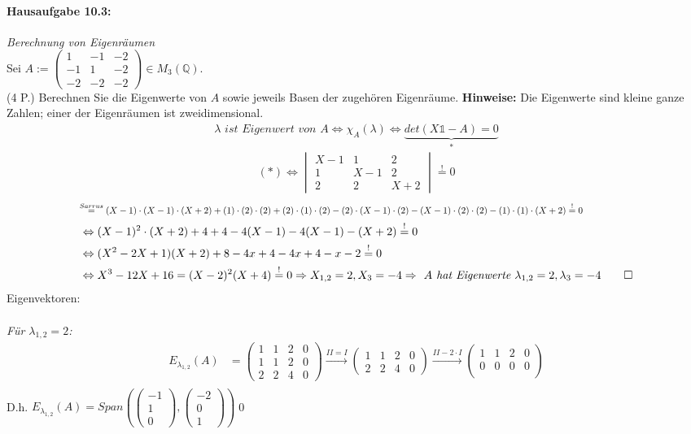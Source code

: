 \documentclass[titlepage]{article}
\newcommand{\Q}{\mathbb{Q}}
\newcommand{\1}{\mathbb{1}}
\newcommand{\0}{\mathbb{0}}
\newcommand{\vecD}[3]{\left(\begin{smallmatrix}#1\\#2\\#3\end{smallmatrix}\right)}
\newcommand{\detD}[9]{\begin{vmatrix}#1&#2&#3\\#4&#5&#6\\#7&#8&#9\end{vmatrix}}
\newcommand{\sarrusD}[9]{(#1)\cdot(#5)\cdot(#9)+(#4)\cdot(#8)\cdot(#3)+(#7)\cdot(#2)\cdot(#6)-(#7)\cdot(#5)\cdot(#3)-(#1)\cdot(#8)\cdot(#6)-(#4)\cdot(#2)\cdot(#9)}
\begin{document}
		\paragraph{Hausaufgabe 10.3:} \textit{Berechnung von Eigenräumen}\\
			Sei $A:=\left(\begin{smallmatrix}
				1&-1&-2\\
				-1&1&-2\\
				-2&-2&-2
			\end{smallmatrix}\right)\in M_3(\Q).$\\
			(4 P.) Berechnen Sie die Eigenwerte von $A$ sowie jeweils Basen der zugehören Eigenräume. \textbf{Hinweise:} Die Eigenwerte sind kleine ganze Zahlen; einer der Eigenräumen ist zweidimensional.
			\begin{align*}
				\lambda\textit{ ist Eigenwert von A}\Leftrightarrow\chi_A(\lambda)\Leftrightarrow\underbrace{ det(X\1-A)=0}_*
			\end{align*}
			\begin{align*}
				(*)\Leftrightarrow\detD{X-1}{1}{2}{1}{X-1}{2}{2}{2}{X+2}\overset{!}{=}0
			\end{align*}
			\begin{align*}
				&\scalebox{0.8}{$\overset{Sarrus}{=}\sarrusD{X-1}{1}{2}{1}{X-1}{2}{2}{2}{X+2}\overset{!}{=}0$}\\
				&\Leftrightarrow(X-1)^2\cdot(X+2)+4+4-4(X-1)-4(X-1)-(X+2)\overset{!}{=}0\\
				&\Leftrightarrow(X^2-2X+1)(X+2)+8-4x+4-4x+4-x-2\overset{!}{=}0\\
				&\Leftrightarrow X^3-12X+16=(X-2)^2(X+4)\overset{!}{=}0\Rightarrow X_{1,2}=2,X_3=-4\Rightarrow\textit{ $A$ hat Eigenwerte $\lambda_{1,2}=2,\lambda_3=-4$}\qed
			\end{align*}
			Eigenvektoren:\\\\
			\indent
			\textit{Für $\lambda_{1,2}=2$:}
			\begin{align*}
				E_{\lambda_{1,2}}(A)&=
				\begin{pmatrix}
					1&1&2&0\\
					1&1&2&0\\
					2&2&4&0
				\end{pmatrix}
				\xrightarrow[]{II=I}
				\begin{pmatrix}
					1&1&2&0\\
					2&2&4&0
				\end{pmatrix}
				\xrightarrow[]{II-2\cdot I}
				\begin{pmatrix}
					1&1&2&0\\
					0&0&0&0\\
				\end{pmatrix}\\
			\end{align*}
			\indent
			D.h. $E_{\lambda_{1,2}}(A)=Span(\vecD{-1}{1}{0},\vecD{-2}{0}{1})$\qed\\\\
		
\end{document}
